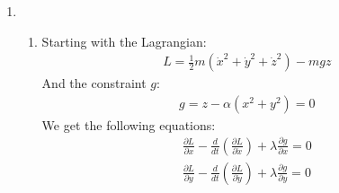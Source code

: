 \documentclass[12pt]{article}
\newcommand{\p}[2]{\frac{\partial #1}{\partial #2}}
\newcommand{\der}[2]{\frac{d #1}{d #2}}
\begin{document}
\begin{enumerate}
\begin{enumerate}
\begin{gather}
                L=T-V=m\dot{s}^2-\frac{1}{2}k(s-a)^2+mgs\\
                L=m\dot{s}^2-\frac{1}{2}k(s^2-2sa+a^2)+mgs
            \end{gather}
            \item
            \begin{gather}
                \der{}{t}\left(\p{L}{\dot{s}}\right)-\p{L}{s}=0\\
                \der{}{t}\left(\p{L}{\dot{s}}\right)=\der{}{t}\left(2m\dot{s}\right)=2m\ddot{s}\\
                \p{L}{s}=-\frac{1}{2}k\left( 2s-2a \right)+mg\\
                2m\ddot{s}+k(s-a) \right)-mg=0\\
                s(t)=a+c_1\sin\left( \sqrt{\frac{k}{2}}t \right)+c_2\cos\left( \sqrt{\frac{k}{2}}t \right)+\frac{gm}{k}
            \end{gather}
            \item
            The equilibrium position where $\ddot{s}=0$:
            \begin{gather}
                \ddot{s}=\frac{mg-k(s-a)}{2m}
            \end{gather}
            \item
            The frequency is clear from the equations of motion:
            \begin{gather}
                \omega=\frac{k}{2}
            \end{gather}
        \end{enumerate}
        \item
        \begin{enumerate}
            \item Starting with the Lagrangian:
            \begin{gather}
                L=\frac{1}{2}m\left(\dot{x}^2+\dot{y}^2+\dot{z}^2\right)-mgz
            \end{gather}
            And the constraint $g$:
            \begin{gather}
                g=z-\alpha\left( x^2+y^2 \right)=0
            \end{gather}
            We get the following equations:
            \begin{gather}
                \p{L}{x}-\der{}{t}\left(\p{L}{\dot{x}}\right)+\lambda\p{g}{x}=0\\
                \p{L}{y}-\der{}{t}\left(\p{L}{\dot{y}}\right)+\lambda\p{g}{y}=0\\

\end{gather}
\end{enumerate}
\end{enumerate}
\end{document}
